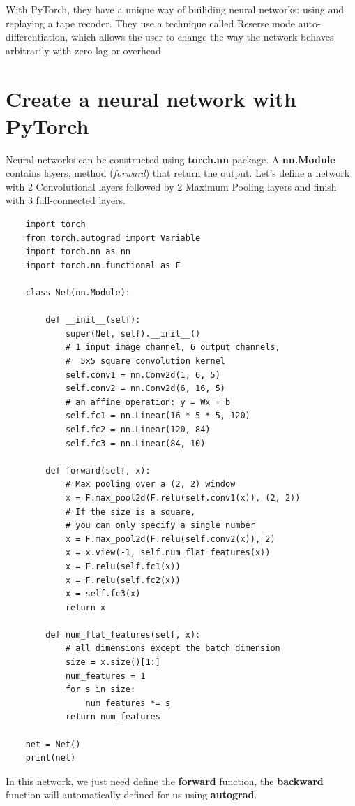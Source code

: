 \documentclass[12pt,a4paper]{article}
\begin{document}
With PyTorch, they have a unique way of builiding neural networks: using and replaying a tape recoder. They use a technique called Reserse mode auto-differentiation, which allows the user to change the way the network behaves arbitrarily with zero lag or overhead

\section{Create a neural network with PyTorch}

Neural networks can be constructed using \textbf{torch.nn} package. A \textbf{nn.Module} contains layers, method (\textit{forward}) that return the output. Let's define a network with 2 Convolutional layers followed by 2 Maximum Pooling layers and finish with 3 full-connected layers.\\
\begin{lstlisting}
	import torch
	from torch.autograd import Variable
	import torch.nn as nn
	import torch.nn.functional as F
	
	class Net(nn.Module):

	    def __init__(self):
	    	super(Net, self).__init__()
        	# 1 input image channel, 6 output channels, 
        	#  5x5 square convolution kernel
        	self.conv1 = nn.Conv2d(1, 6, 5)
        	self.conv2 = nn.Conv2d(6, 16, 5)
        	# an affine operation: y = Wx + b
        	self.fc1 = nn.Linear(16 * 5 * 5, 120)
        	self.fc2 = nn.Linear(120, 84)
        	self.fc3 = nn.Linear(84, 10)

	    def forward(self, x):
	    	# Max pooling over a (2, 2) window
        	x = F.max_pool2d(F.relu(self.conv1(x)), (2, 2))
        	# If the size is a square,
        	# you can only specify a single number
        	x = F.max_pool2d(F.relu(self.conv2(x)), 2)
        	x = x.view(-1, self.num_flat_features(x))
        	x = F.relu(self.fc1(x))
        	x = F.relu(self.fc2(x))
        	x = self.fc3(x)
        	return x

	    def num_flat_features(self, x):
	    	# all dimensions except the batch dimension
	    	size = x.size()[1:]  
        	num_features = 1
        	for s in size:
            	num_features *= s
        	return num_features

	net = Net()
	print(net)
\end{lstlisting}

In this network, we just need define the \textbf{forward} function, the \textbf{backward} function will automatically defined for us using \textbf{autograd}.
\end{document}
